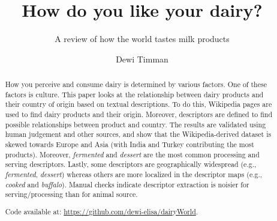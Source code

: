 \documentclass[sigconf]{acmart-txmm}
\begin{document}
\title{How do you like your dairy?}
\subtitle{A review of how the world tastes milk products}



\author{Dewi Timman}

\renewcommand{\shortauthors}{Dewi Timman}
\renewcommand{\shorttitle}{How do you like your dairy?}

\begin{abstract}
How you perceive and consume dairy is determined by various factors. 
One of these factors is culture. 
This paper looks at the relationship between dairy products and their country of origin based on textual descriptions.
To do this, Wikipedia pages are used to find dairy products and their origin.
Moreover, descriptors are defined to find possible relationships between product and country.
The results are validated using human judgement and other sources, and show that the Wikipedia-derived dataset is skewed towards Europe and Asia (with India and Turkey contributing the most products).
Moreover, \emph{fermented} and \emph{dessert} are the most common processing and serving descriptors.
Lastly, some descriptors are geographically widespread (e.g., \emph{fermented}, \emph{dessert}) whereas others are more localized in the descriptor maps (e.g., \emph{cooked} and \emph{buffalo}). 
Manual checks indicate descriptor extraction is noisier for serving/processing than for animal source.

Code available at: \url{https://github.com/dewi-elisa/dairyWorld}.
\end{abstract}
\end{document}
